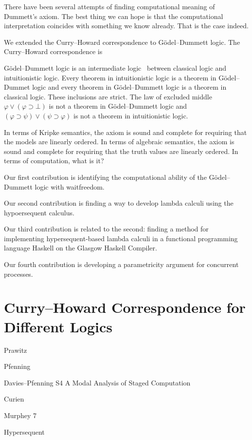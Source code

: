 There have been several attempts of finding computational meaning of
Dummett's axiom.  
The best thing we can hope is that the computational
interpretation coincides with something we know already.
That is the case indeed.

We extended the Curry--Howard correspondence to G\"odel--Dummett logic.
The Curry--Howard correspondence is 

G\"odel--Dummett logic is an intermediate logic~\citep{umezawa} between
classical logic and intuitionistic logic.  Every theorem in
intuitionistic logic is a theorem in G\"odel--Dummet logic and every
theorem in G\"odel--Dummett logic is a theorem in classical logic.
These inclusions are strict.  The law of excluded middle
$\varphi\vee(\varphi\supset \bot)$ is not a theorem in G\"odel--Dummett
logic and $(\varphi\supset\psi)\vee(\psi\supset\varphi)$ is not a
theorem in intuitionistic logic.

In terms of Kripke semantics, the axiom is sound and complete for
requiring that the models are linearly ordered.
In terms of algebraic semantics, the axiom is sound and complete for
requiring that the truth values are linearly ordered.  
In terms of computation, what is it?


Our first contribution is identifying the computational ability of the
G\"odel--Dummett logic with waitfreedom.

Our second contribution is finding a way to develop lambda calculi using
the hypoersequent calculus.

Our third contribution is related to the second:
finding a method for implementing hypersequent-based lambda calculi in a
functional programming language Haskell on the Glasgow Haskell Compiler.

Our fourth contribution is developing a parametricity argument for
concurrent processes.

\section{Curry--Howard Correspondence for Different Logics}

Prawitz

Pfenning

Davies--Pfenning S4 A Modal Analysis of Staged Computation

Curien

Murphey 7

Hypersequent

